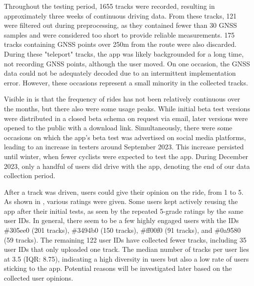 Throughout the testing period, 1655 tracks were recorded, resulting in approximately three weeks of continuous driving data. From these tracks, 121 were filtered out during preprocessing, as they contained fewer than 30 GNSS samples and were considered too short to provide reliable measurements. 175 tracks containing GNSS points over 250m from the route were also discarded. During these "teleport" tracks, the app was likely backgrounded for a long time, not recording GNSS points, although the user moved. On one occasion, the GNSS data could not be adequately decoded due to an intermittent implementation error. However, these occasions represent a small minority in the collected tracks.

Visible in  is that the frequency of rides has not been relatively continuous over the months, but there also were some usage peaks. While initial beta test versions were distributed in a closed beta schema on request via email, later versions were opened to the public with a download link. Simultaneously, there were some occasions on which the app's beta test was advertised on social media platforms, leading to an increase in testers around September 2023. This increase persisted until winter, when fewer cyclists were expected to test the app. During December 2023, only a handful of users did drive with the app, denoting the end of our data collection period. 

After a track was driven, users could give their opinion on the ride, from 1 to 5. As shown in , various ratings were given. Some users kept actively reusing the app after their initial tests, as seen by the repeated 5-grade ratings by the same user IDs. In general, there seem to be a few highly engaged users with the IDs \#305ee0 (201 tracks), \#3494b0 (150 tracks), \#ff00f0 (91 tracks), and \#0a9580 (59 tracks). The remaining 122 user IDs have collected fewer tracks, including 35 user IDs that only uploaded one track. The median number of tracks per user lies at 3.5 (IQR: 8.75), indicating a high diversity in users but also a low rate of users sticking to the app. Potential reasons will be investigated later based on the collected user opinions.

